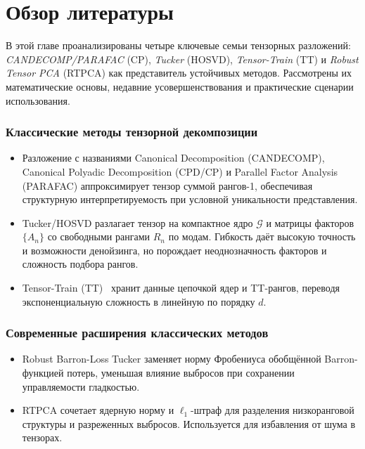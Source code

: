 \chapter{Обзор литературы}
\label{chap:lr}

В этой главе проанализированы четыре ключевые семьи тензорных разложений: \emph{CANDECOMP/PARAFAC} (CP), \emph{Tucker} (HOSVD), \emph{Tensor-Train} (TT) и \emph{Robust Tensor PCA} (RTPCA) как представитель устойчивых методов. Рассмотрены их математические основы, недавние усовершенствования и практические сценарии использования.

\subsection*{Классические методы тензорной декомпозиции}

\begingroup
\sloppy
\begin{itemize}\setlength\itemsep{0.25em}
    \item Разложение с названиями Canonical Decomposition (CANDECOMP), Canonical Polyadic Decomposition (CPD/CP) и Parallel Factor Analysis (PARAFAC) аппроксимирует тензор суммой рангов-1, обеспечивая структурную интерпретируемость при условной уникальности представления.
    \item Tucker/HOSVD разлагает тензор на компактное ядро \( \mathcal{G} \) и матрицы факторов \(\{A_n\}\) со свободными рангами \(R_n\) по модам. Гибкость даёт высокую точность и возможности денойзинга, но порождает неоднозначность факторов и сложность подбора рангов.
    \item Tensor-Train (TT)~\cite{tensorly_tensor_train} хранит данные цепочкой ядер и TT-рангов, переводя экспоненциальную сложность в линейную по порядку \(d\).
\end{itemize}
\endgroup

\subsection*{Современные расширения классических методов}

\begin{itemize}\setlength\itemsep{0.25em}
    \item Robust Barron-Loss Tucker заменяет норму Фробениуса обобщённой Barron-функцией потерь, уменьшая влияние выбросов при сохранении управляемости гладкостью.
    \item RTPCA сочетает ядерную норму и $\ell_1$-штраф для разделения низкоранговой структуры и разреженных выбросов. Используется для избавления от шума в тензорах.
\end{itemize}

